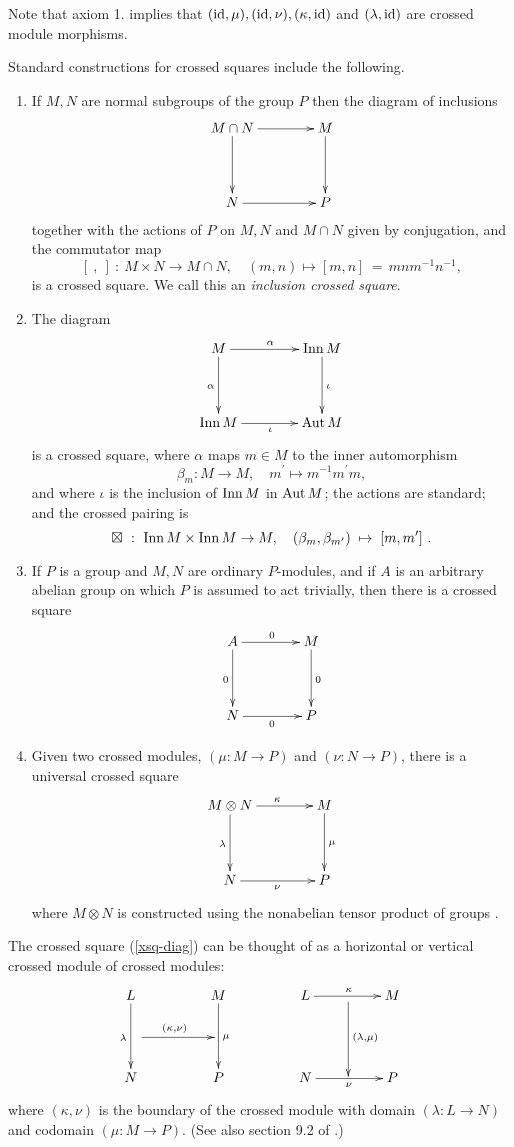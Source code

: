 \documentclass[a4paper,11pt]{article}
\theoremstyle{plain}
\theoremstyle{definition}
\begin{document}
\noindent 
Note that axiom 1. implies that $(\mathrm{id},\mu), (\mathrm{id},\nu), (\kappa,\mathrm{id})$ 
and $(\lambda,\mathrm{id})$ are crossed module morphisms. 

\medskip 
\noindent 
Standard constructions for crossed squares include the following.
\begin{enumerate}
\item 
If $M,N$ are normal subgroups of the group $P$ then the diagram of inclusions
\[
\xymatrix@R=40pt@C=40pt
{ M \cap N \ar[r]^(0.6){} \ar[d]_{}  
	& M \ar[d]^{} \\
	N \ar[r]_{}  
	& P }
\] 
\noindent together with the actions of $P$ on $M,N$ and $M\cap N$ 
given by conjugation, and the commutator map 
\[
[~,~] ~:~ M\times N \rightarrow M\cap N,\quad 
(m,n)\mapsto [m,n] \,=\, mnm^{-1}n^{-1}, 
\] 
is a crossed square. 
We call this an \emph{inclusion crossed square}.
\item 
The diagram
\[
\xymatrix@R=40pt@C=40pt
{ M \ar[r]^{\alpha} \ar[d]_{\alpha} 
	& \Inn\,M \ar[d]^{\iota} \\
	\Inn\,M \ar[r]_{\iota} 
	& \Aut\,M }
\] 
\noindent is a crossed square, 
where $\alpha $ maps $m\in M$ to the inner automorphism%
\[
\beta_{m} : M \rightarrow M,\quad 
m^{\prime}\mapsto m^{-1}m^{\prime}m, 
\]
and where $\iota $ is the inclusion of $\mathrm{Inn}\,M$ in $\mathrm{Aut}\,M$; 
the actions are standard; and the crossed pairing is
\[
\boxtimes ~:~ \mathrm{Inn}\,M \times \mathrm{Inn}\,M \rightarrow M,\quad 
(\beta_{m},\beta_{m^{\prime}}) \;\mapsto\; [m,m^{\prime}]~.
\]
\item 
If $P$ is a group and $M,N$ are ordinary $P$-modules, 
and if $A$ is an arbitrary abelian group on which $P$ is assumed to act trivially, 
then there is a crossed square
\[
\xymatrix@R=40pt@C=40pt
{ A \ar[r]^{0} \ar[d]_{0}  
	& M \ar[d]^{0} \\
	N \ar[r]_{0} 
	& P }
\]
\item 
Given two crossed modules, $(\mu : M \rightarrow P)$ and $(\nu : N \rightarrow P)$, 
there is a universal crossed square 
\[
\xymatrix@R=40pt@C=40pt
{ M \otimes N \ar[d]_{\lambda} \ar[r]^{\kappa} 
	& M \ar[d]^{\mu} \\ 
	N \ar[r]_{\nu} 
	& P } 
\] 
where $M \otimes N$ is constructed using the nonabelian tensor product of groups 
\cite{brown-loday}. 
\end{enumerate}

The crossed square (\ref{xsq-diag}) can be thought of as a horizontal or vertical 
crossed module of crossed modules:
\[
\xymatrix@R=20pt@C=20pt
{ L \ar[dd]_{\lambda}  
	&  &  M \ar[dd]^{\mu} 
	      &  &  L \ar[rr]^{\kappa}
	            &  {} \ar[dd]^{(\lambda,\mu)} 
	               &  M \\ 
\quad \ar[rr]^{(\kappa,\nu)} 
    &  &  &  &  &  & \quad \\
  N &  &  P 
	      &  &  N \ar[rr]_{\nu} 
	            &  {} 
	               &  P 
} 
\]
\noindent 
where $(\kappa,\nu)$ is the boundary of the crossed module with 
domain $(\lambda : L \rightarrow N)$ and codomain $(\mu : M \rightarrow P)$. 
(See also section 9.2 of \cite{wensley-notes}.)
\end{document}
